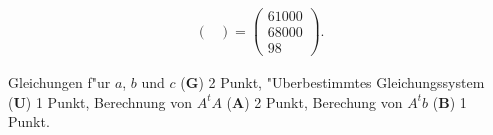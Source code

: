 \begin{loesung}
\begin{align*}
\begin{pmatrix}
\end{pmatrix}=\begin{pmatrix}61000\\68000\\98\end{pmatrix}.
\end{align*}
\end{loesung}

\begin{bewertung}
Gleichungen f"ur $a$, $b$ und $c$ ({\bf G}) 2 Punkt,
"Uberbestimmtes Gleichungssystem ({\bf U}) 1 Punkt,
Berechnung von $A^tA$ ({\bf A}) 2 Punkt,
Berechung von $A^tb$ ({\bf B}) 1 Punkt.
\end{bewertung}

